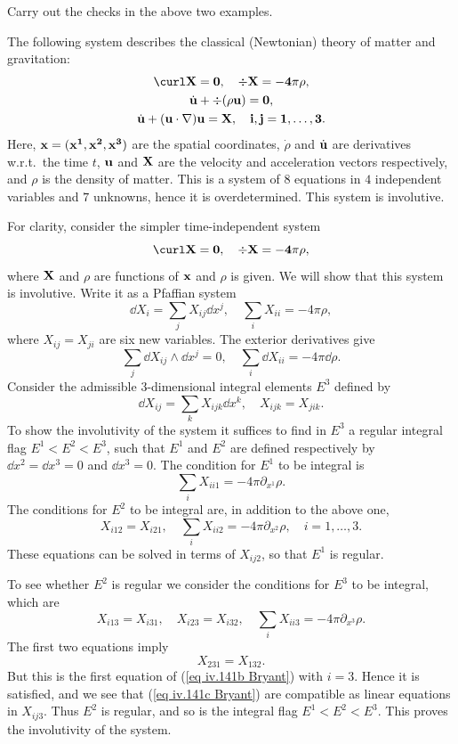 \begin{xca}
    Carry out the checks in the above two examples.
\end{xca}


\begin{example}
    The following system describes the classical (Newtonian) theory of matter and gravitation:
    \begin{gather}
        \curl \bf{X}=0,\quad \div \bf{X}=-4\pi \rho,\\
        \dot{\bf{u}} +\div(\rho \bf{u})=0,\\
        \dot{\bf{u}}+(\bf{u}\cdot \nabla)\bf{u}=\bf{X},\quad i,j=1,\ldots,3.
    \end{gather} 
    Here, $\bf{x}=(x^1,x^2,x^3)$ are the spatial coordinates, $\dot\rho$ and $\dot{\bf{u}}$ are derivatives w.r.t.\ the time $t$, $\bf{u}$ and $\bf{X}$ are the velocity and acceleration vectors respectively, and $\rho$ is the density of matter. This is a system of $8$ equations in $4$ independent variables and $7$ unknowns, hence it is overdetermined. This system is involutive. 

    For clarity, consider the simpler time-independent system 
    \[\curl \bf{X}=0,\quad \div\bf{X}=-4\pi\rho,\]
    where $\bf{X}$ and $\rho$ are functions of $\bf{x}$ and $\rho$ is given. We will show that this system is involutive. Write it as a Pfaffian system 
    \[\dd X_i=\sum_j X_{ij}\dd x^j,\quad \sum_i X_{ii}=-4\pi \rho,\]
    where $X_{ij}=X_{ji}$ are six new variables. The exterior derivatives give 
    \[\sum_j \dd X_{ij}\wedge\dd x^j=0,\quad \sum_i \dd X_{ii}=-4\pi \dd \rho.\]
    Consider the admissible $3$-dimensional integral elements $E^3$ defined by 
    \[\dd X_{ij}=\sum_k X_{ijk}\dd x^k,\quad X_{ijk}=X_{jik}.\]
    To show the involutivity of the system it suffices to find in $E^3$ a regular integral flag $E^1<E^2<E^3$, such that $E^1$ and $E^2$ are defined respectively by $\dd x^2=\dd x^3=0$ and $\dd x^3=0$. The condition for $E^1$ to be integral is 
    \[\sum_i X_{ii1}=-4\pi \partial_{x^1}\rho.\]
    The conditions for $E^2$ to be integral are, in addition to the above one, 
    \[X_{i12}=X_{i21},\quad \sum_i X_{ii2}=-4\pi \partial_{x^2}\rho ,\quad i=1,\ldots,3.\label{eq iv.141b Bryant}\]
    These equations can be solved in terms of $X_{ij2}$, so that $E^1$ is regular.
    
    To see whether $E^2$ is regular we consider the conditions for $E^3$ to be integral, which are 
    \[X_{i13}=X_{i31}, \quad X_{i23}=X_{i32},\quad \sum_i X_{ii3}=-4\pi \partial_{x^3}\rho.\label{eq iv.141c Bryant}\]
    The first two equations imply 
    \[X_{231}=X_{132}.\]
    But this is the first equation of (\ref{eq iv.141b Bryant}) with $i=3$. Hence it is satisfied, and we see that (\ref{eq iv.141c Bryant}) are compatible as linear equations in $X_{ij3}$. Thus $E^2$ is regular, and so is the integral flag $E^1<E^2<E^3$. This proves the involutivity of the system.


\end{example}
